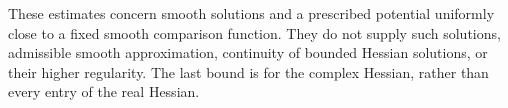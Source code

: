 These estimates concern smooth solutions and a prescribed potential uniformly close to a fixed smooth comparison function. They do not supply such solutions, admissible smooth approximation, continuity of bounded Hessian solutions, or their higher regularity. The last bound is for the complex Hessian, rather than every entry of the real Hessian.
